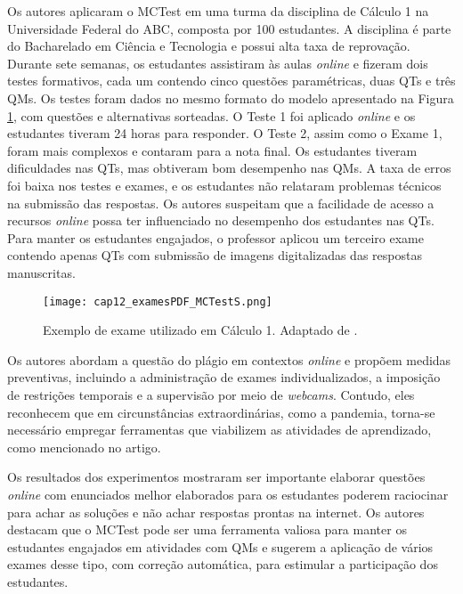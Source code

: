 Os autores aplicaram o MCTest em uma turma da disciplina de Cálculo 1 na Universidade Federal do ABC, composta por 100 estudantes. A disciplina é parte do Bacharelado em Ciência e Tecnologia e possui alta taxa de reprovação. Durante sete semanas, os estudantes assistiram às aulas \textit{online} e fizeram dois testes formativos, cada um contendo cinco questões paramétricas, duas QTs e três QMs. Os testes foram dados no mesmo formato do modelo apresentado na Figura \ref{fig:cap12_examesPDF_MCTestS}, com questões e alternativas sorteadas. O Teste 1 foi aplicado \textit{online} e os estudantes tiveram 24 horas para responder. O Teste 2, assim como o Exame 1, foram mais complexos e contaram para a nota final. Os estudantes tiveram dificuldades nas QTs, mas obtiveram bom desempenho nas QMs. A taxa de erros foi baixa nos testes e exames, e os estudantes não relataram problemas técnicos na submissão das respostas. Os autores suspeitam que a facilidade de acesso a recursos \textit{online} possa ter influenciado no desempenho dos estudantes nas QTs. Para manter os estudantes engajados, o professor aplicou um terceiro exame contendo apenas QTs com submissão de imagens digitalizadas das respostas manuscritas.

\begin{figure}[!ht]
\centering
  \texttt{[image: cap12\_examesPDF\_MCTestS.png]}
  \caption{Exemplo de exame utilizado em Cálculo 1. Adaptado de .}
  \label{fig:cap12_examesPDF_MCTestS}
\end{figure}

Os autores abordam a questão do plágio em contextos \textit{online} e propõem medidas preventivas, incluindo a administração de exames individualizados, a imposição de restrições temporais e a supervisão por meio de \textit{webcams}. Contudo, eles reconhecem que em circunstâncias extraordinárias, como a pandemia, torna-se necessário empregar ferramentas que viabilizem as atividades de aprendizado, como mencionado no artigo.

Os resultados dos experimentos mostraram ser importante elaborar questões \textit{online} com enunciados melhor elaborados para os estudantes poderem raciocinar para achar as soluções e não achar respostas prontas na internet.
%
Os autores destacam que o MCTest pode ser uma ferramenta valiosa para manter os estudantes engajados em atividades com QMs e sugerem a aplicação de vários exames desse tipo, com correção automática, para estimular a participação dos estudantes.

